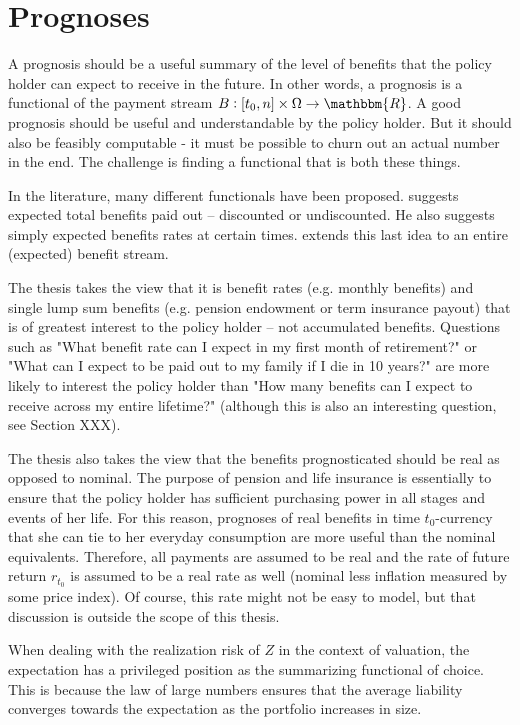\documentclass{book}
\newcommand{\1}[1]{\mathbbm{1}_{\left\lbrace #1 \right\rbrace}}
\theoremstyle{break}
\theoremstyle{remark}
\numberwithin{equation}{section}
\begin{document}
\newpage

\chapter{Prognoses}

A prognosis should be a useful summary of the level of benefits that the policy holder can expect to receive in the future. In other words, a prognosis is a functional of the payment stream $B: [t_0,n] \times \Omega \to \mathbbm{R}$. A good prognosis should be useful and understandable by the policy holder. But it should also be feasibly computable - it must be possible to churn out an actual number in the end. The challenge is finding a functional that is both these things.

In the literature, many different functionals have been proposed. \cite{Norberg2001} suggests expected total benefits paid out -- discounted or undiscounted. He also suggests simply expected benefits rates at certain times. \cite{NinaReitzel} extends this last idea to an entire (expected) benefit stream.

The thesis takes the view that it is benefit rates (e.g. monthly benefits) and single lump sum benefits (e.g. pension endowment or term insurance payout) that is of greatest interest to the policy holder -- not accumulated benefits. Questions such as "What benefit rate can I expect in my first month of retirement?" or "What can I expect to be paid out to my family if I die in 10 years?" are more likely to interest the policy holder than "How many benefits can I expect to receive across my entire lifetime?" (although this is also an interesting question, see Section XXX).

The thesis also takes the view that the benefits prognosticated should be real as opposed to nominal. The purpose of pension and life insurance is essentially to ensure that the policy holder has sufficient purchasing power in all stages and events of her life. For this reason, prognoses of real benefits in time $t_0$-currency that she can tie to her everyday consumption are more useful than the nominal equivalents. Therefore, all payments are assumed to be real and the rate of future return $r_{t_0}$ is assumed to be a real rate as well (nominal less inflation measured by some price index). Of course, this rate might not be easy to model, but that discussion is outside the scope of this thesis.

When dealing with the realization risk of $Z$ in the context of valuation, the expectation has a privileged position as the summarizing functional of choice. This is because the law of large numbers ensures that the average liability converges towards the expectation as the portfolio increases in size.
\end{document}
